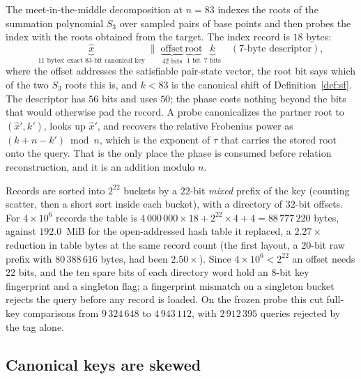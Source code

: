 The meet-in-the-middle decomposition at $n=83$ indexes the roots of
the summation polynomial $S_3$ over sampled pairs of base points and
then probes the index with the roots obtained from the target. The
index record is $18$ bytes:
\[
  \underbrace{\hat x}_{\text{11 bytes: exact 83-bit canonical key}}
  \;\|\;
  \underbrace{\text{offset}}_{\text{42 bits}}\,
  \underbrace{\text{root}}_{\text{1 bit}}\,
  \underbrace{k}_{\text{7 bits}}
  \quad(\text{7-byte descriptor}),
\]
where the offset addresses the satisfiable pair-state vector, the root
bit says which of the two $S_3$ roots this is, and $k<83$ is the
canonical shift of Definition~\ref{def:sf}.
The descriptor has $56$ bits and uses $50$; the phase costs nothing
beyond the bits that would otherwise pad the record. A probe
canonicalizes the partner root to $(\hat x',k')$, looks up $\hat x'$,
and recovers the relative Frobenius power as $(k+n-k')\bmod n$, which
is the exponent of $\tau$ that carries the stored root onto the
query. That is the only place the phase is consumed before relation
reconstruction, and it is an addition modulo $n$.

Records are sorted into $2^{22}$ buckets by a $22$-bit \emph{mixed}
prefix of the key (counting scatter, then a short sort inside each
bucket), with a directory of $32$-bit offsets. For $4\times10^6$
records the table is
$4\,000\,000\times18+2^{22}\times4+4=88\,777\,220$ bytes, against
$192.0$~MiB for the open-addressed hash table it replaced, a $2.27\times$
reduction in table bytes at the same record count (the first layout,
a $20$-bit raw prefix with $80\,388\,616$ bytes, had been
$2.50\times$).
Since $4\times10^6<2^{22}$ an offset needs $22$ bits, and the ten
spare bits of each directory word hold an $8$-bit key fingerprint and
a singleton flag; a fingerprint mismatch on a singleton bucket rejects
the query before any record is loaded. On the frozen probe this cut
full-key comparisons from $9\,324\,648$ to $4\,943\,112$, with
$2\,912\,395$ queries rejected by the tag
alone.

\subsection{Canonical keys are skewed}
\label{sec:skew}

